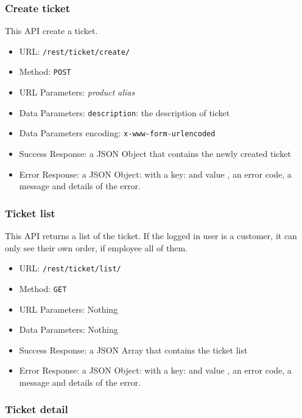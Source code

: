 \subsubsection*{Create ticket}

This API create a ticket.

\begin{itemize}
    \item URL: \texttt{/rest/ticket/create/}
    \item Method: \texttt{POST}
    \item URL Parameters: \textit{product alias}
    \item Data Parameters: \texttt{description}: the description of ticket
    \item Data Parameters encoding: \texttt{x-www-form-urlencoded}
    \item Success Response: a JSON Object that contains the newly created ticket
    \item Error Response: a JSON Object: with a key:   and value , an error code, a message and details of the error.
\end{itemize}

\subsubsection*{Ticket list}

This API returns a list of the ticket.
If the logged in user is a customer, it can only see their own order, if employee all of them.

\begin{itemize}
    \item URL: \texttt{/rest/ticket/list/}
    \item Method: \texttt{GET}
    \item URL Parameters: Nothing
    \item Data Parameters: Nothing
    \item Success Response:  a JSON Array that contains the ticket list
    \item Error Response: a JSON Object: with a key:   and value , an error code, a message and details of the error.
\end{itemize}

\subsubsection*{Ticket detail}

